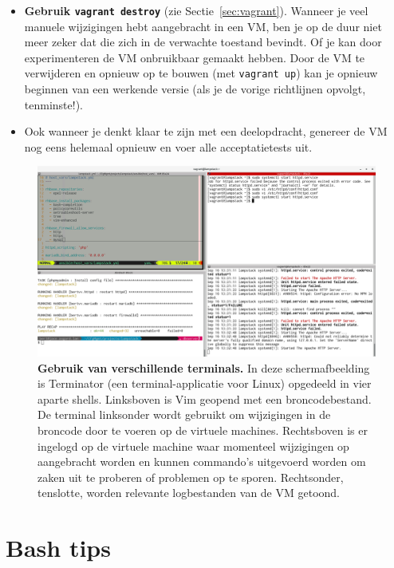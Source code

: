 \begin{itemize}
  \item \textbf{Gebruik \texttt{vagrant destroy}} (zie Sectie~\ref{sec:vagrant}). Wanneer je veel manuele wijzigingen hebt aangebracht in een VM, ben je op de duur niet meer zeker dat die zich in de verwachte toestand bevindt. Of je kan door experimenteren de VM onbruikbaar gemaakt hebben. Door de VM te verwijderen en opnieuw op te bouwen (met \texttt{vagrant up}) kan je opnieuw beginnen van een werkende versie (als je de vorige richtlijnen opvolgt, tenminste!).
  \item Ook wanneer je denkt klaar te zijn met een deelopdracht, genereer de VM nog eens helemaal opnieuw en voer alle acceptatietests uit.
\end{itemize}

\begin{figure}
  \centering
  \includegraphics[width=\linewidth]{img/screenshot-terminals}
  \caption[Gebruik van verschillende terminals.]{\textbf{Gebruik van verschillende terminals.} In deze schermafbeelding is Terminator (een terminal-applicatie voor Linux) opgedeeld in vier aparte shells. Linksboven is Vim geopend met een broncodebestand. De terminal linksonder wordt gebruikt om wijzigingen in de broncode door te voeren op de virtuele machines. Rechtsboven is er ingelogd op de virtuele machine waar momenteel wijzigingen op aangebracht worden en kunnen commando's uitgevoerd worden om zaken uit te proberen of problemen op te sporen. Rechtsonder, tenslotte, worden relevante logbestanden van de VM getoond.}
  \label{fig:screenshot-terminals}
\end{figure}

\section{Bash tips}
\label{sec:bash_tips}

